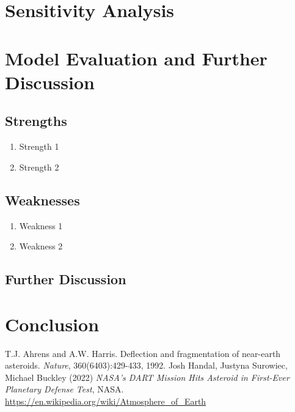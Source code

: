 \documentclass[12pt]{article}
\begin{document}
\section{\textbf{Sensitivity Analysis}}


\section{\textbf{Model Evaluation and Further Discussion}}
\subsection{\textbf{Strengths}}
\begin{enumerate}
    \item Strength 1
    \item Strength 2
\end{enumerate}

\subsection{\textbf{Weaknesses}}
\begin{enumerate}
    \item Weakness 1
    \item Weakness 2
\end{enumerate}

\subsection{\textbf{Further Discussion}}


\section{Conclusion}


\begin{thebibliography}{99} %
     T.J. Ahrens and A.W. Harris. Deflection and fragmentation of near-earth asteroids. \textit{Nature}, 360(6403):429-433, 1992.
     Josh Handal, Justyna Surowiec, Michael Buckley (2022) \textit{NASA's DART Mission Hits Asteroid in First-Ever Planetary Defense Test}, NASA. 
     \url{https://en.wikipedia.org/wiki/Atmosphere_of_Earth}
  \end{thebibliography}
\end{document}
